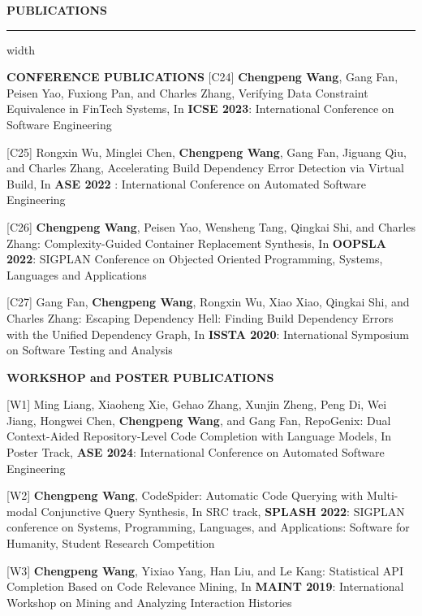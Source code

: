 \documentclass[centered]{resume}
\newlength{\cvsectiongap}
\newenvironment{rSection}[1]{%
  \par\Needspace{5\baselineskip}\addvspace{\cvsectiongap}
  {\bfseries \MakeUppercase{#1}}\vspace{0.65em}%
  \noindent\hrule width \linewidth\vspace{-0.45em}\par
}{\par}
\newenvironment{subsection*}[4]{%
  \par\Needspace{5\baselineskip}\noindent #1\par\nobreak
}{}
\begin{document}
\begin{resume}
\begin{rSection}{Publications}
\begin{subsection*}{\textbf{CONFERENCE PUBLICATIONS}}{}{}{}
[C24] \textbf{Chengpeng Wang}, Gang Fan, Peisen Yao, Fuxiong Pan, and Charles Zhang, Verifying Data Constraint Equivalence in FinTech Systems, In \textbf{ICSE 2023}: International Conference on Software Engineering

[C25] Rongxin Wu, Minglei Chen, \textbf{Chengpeng Wang}, Gang Fan, Jiguang Qiu, and Charles Zhang, Accelerating Build Dependency Error Detection via Virtual Build, In \textbf{ASE 2022} : International Conference on Automated Software Engineering

[C26] \textbf{Chengpeng Wang}, Peisen Yao, Wensheng Tang, Qingkai Shi, and Charles Zhang: {Complexity-Guided Container Replacement Synthesis}, In \textbf{OOPSLA 2022}: SIGPLAN Conference on Objected Oriented Programming, Systems, Languages and Applications

[C27] Gang Fan, \textbf{Chengpeng Wang}, Rongxin Wu, Xiao Xiao, Qingkai Shi, and Charles Zhang: {Escaping Dependency Hell: Finding Build Dependency Errors with the Unified Dependency Graph}, In \textbf{ISSTA 2020}: International Symposium on Software Testing and Analysis

\end{subsection*}

\vspace{1mm}

\begin{subsection*}{\textbf{WORKSHOP and POSTER PUBLICATIONS}}{}{}{}

[W1] Ming Liang, Xiaoheng Xie, Gehao Zhang, Xunjin Zheng, Peng Di, Wei Jiang, Hongwei Chen, \textbf{Chengpeng Wang}, and Gang Fan, RepoGenix: Dual Context-Aided Repository-Level Code Completion with Language Models, In Poster Track, \textbf{ASE 2024}: International Conference on Automated Software Engineering


[W2] \textbf{Chengpeng Wang}, CodeSpider: Automatic Code Querying with Multi-modal Conjunctive Query Synthesis, In SRC track, \textbf{SPLASH 2022}: SIGPLAN conference on Systems, Programming, Languages, and Applications: Software for Humanity, Student Research Competition



[W3] \textbf{Chengpeng Wang}, Yixiao Yang, Han Liu, and Le Kang: {Statistical API Completion Based on Code Relevance Mining}, In \textbf{MAINT 2019}: International Workshop on Mining and Analyzing Interaction Histories 

\end{subsection*}


\end{rSection}
\end{resume}
\end{document}
